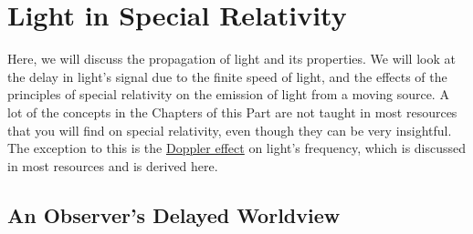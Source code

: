 
%

\part{Light in Special Relativity}\label{Part: light in special relativity}

Here, we will discuss the propagation of light and its properties.
We will look at the delay in light's signal due to the finite speed of light, and the effects of the principles of special relativity on the emission of light from a moving source.
A lot of the concepts in the Chapters of this Part are not taught in most resources that you will find on special relativity, even though they can be very insightful.
The exception to this is the \hyperlink{def-doppler-effect}{Doppler effect} on light's frequency, which is discussed in most resources and is derived here.

\chapter{An Observer's Delayed Worldview}\label{ch: An Observer's Delayed Worldview}

